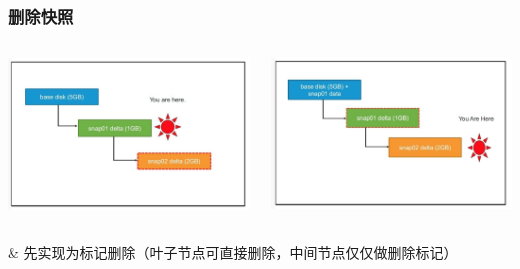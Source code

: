 \documentclass[UTF8,8pt,xcolor=dvipsnames]{beamer}
\newenvironment{myeasylist}[1]{
    \Activate
    \begin{tcolorbox}
    \begin{easylist}[#1]
} {
    \end{easylist}
    \end{tcolorbox}
    \Deactivate
}
\begin{document}
\begin{frame}[fragile]
    \frametitle{删除快照}
    \begin{columns}
        \begin{column}{0.5\textwidth}
            \begin{center}
                \includegraphics[width=1.0\textwidth]{../imgs/snap-delete-leaf.png}
            \end{center}
        \end{column}

        \begin{column}{0.5\textwidth}
            \begin{center}
                \includegraphics[width=1.0\textwidth]{../imgs/snap-delete-non-leaf.png}
            \end{center}
        \end{column}
    \end{columns}
    \begin{myeasylist}{itemize}
        & 先实现为标记删除（叶子节点可直接删除，中间节点仅仅做删除标记）
    \end{myeasylist}
\end{frame}
\end{document}
